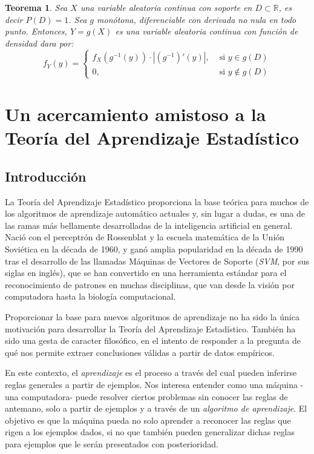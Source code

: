 \documentclass{report}
\newtheorem{thm}{Teorema}[section]
\begin{document}
\begin{thm}
    Sea $X$ una variable aleatoria continua con soporte en $D\subset\mathbb{R}$, es decir $P(D)=1$. Sea $g$ monótona, diferenciable con derivada no nula en 
    todo punto. Entonces, $Y=g(X)$ es una variable aleatoria continua con función de densidad dara por:
    \begin{equation*}
        f_Y(y)=\begin{cases}
            f_X(g^{-1}(y)) \cdot |(g^{-1})'(y)|, &\text{ si } y\in g(D)\\
            0, & \text{ si } y\notin g(D)
        \end{cases}
    \end{equation*}
\end{thm}




\chapter{Un acercamiento amistoso a la Teoría del Aprendizaje Estadístico}
\section{Introducción}
La Teoría del Aprendizaje Estadístico proporciona la base teórica para muchos de los algoritmos de aprendizaje automático actuales y,
sin lugar a dudas, es una de las ramas más bellamente desarrolladas de la inteligencia artificial en general. Nació con el perceptrón de Rossenblat
y la escuela matemática de la Unión Soviética en la década de 1960, y ganó amplia popularidad en la década de 1990 tras el desarrollo de las llamadas 
Máquinas de Vectores de Soporte (\textit{SVM}, por sus siglas en inglés), que se han convertido en una herramienta estándar para el reconocimiento de 
patrones en muchas disciplinas, que van desde la visión por computadora hasta la biología computacional.\newline

Proporcionar la base para nuevos algoritmos de aprendizaje no ha sido la única motivación para desarrollar la Teoría del Aprendizaje 
Estadístico. También ha sido una gesta de caracter filosófico, en el intento de responder a la pregunta de qué nos permite extraer conclusiones válidas 
a partir de datos empíricos.  \newline


En este contexto, el \textit{aprendizaje} es el proceso a través del cual pueden inferirse reglas generales a partir de ejemplos. Nos interesa 
entender como una máquina -una computadora- puede resolver ciertos problemas sin conocer las reglas de antemano, solo a partir de ejemplos y a través
de un \textit{algoritmo de aprendizaje}. El objetivo es que la máquina pueda no solo aprender a reconocer las reglas que rigen a los ejemplos dados,
si no que también pueden generalizar dichas reglas para ejemplos que le serán presentados con posterioridad.\newline
\end{document}
